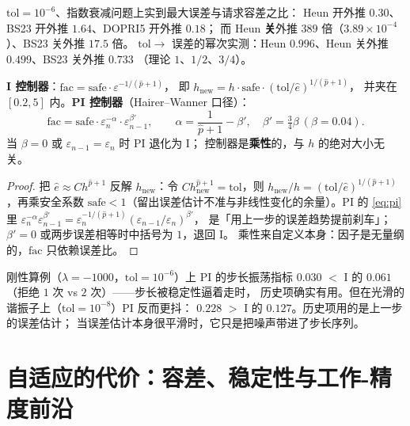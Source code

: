 \begin{corollary}[实测：$389$ 倍的假收敛]
\label{cor:fake}
$\mathrm{tol}=10^{-6}$、指数衰减问题上实到最大误差与请求容差之比：
Heun 开外推 $0.30$、BS23 开外推 $1.64$、DOPRI5 开外推 $0.18$；
而 Heun \textbf{关}外推 $389$ 倍（$3.89\times10^{-4}$）、BS23 关外推 $17.5$ 倍。
$\mathrm{tol}\to$ 误差的幂次实测：Heun $0.996$、Heun 关外推 $0.499$、BS23 关外推 $0.733$
（理论 $1$、$1/2$、$3/4$）。
\end{corollary}

\begin{theorem}[步长控制器]
\label{thm:controller}
\textbf{I 控制器}：$\mathrm{fac}=\mathrm{safe}\cdot\varepsilon^{-1/(\hat p+1)}$，
即 $h_{\text{new}}=h\cdot\mathrm{safe}\cdot(\mathrm{tol}/\hat e)^{1/(\hat p+1)}$，
并夹在 $[0.2,5]$ 内。\textbf{PI 控制器}（Hairer--Wanner 口径）：
\begin{equation}
  \mathrm{fac}=\mathrm{safe}\cdot\varepsilon_n^{-\alpha}\cdot\varepsilon_{n-1}^{\beta'},
  \qquad \alpha=\frac1{\hat p+1}-\beta',\quad \beta'=\tfrac34\beta\ (\beta=0.04).
  \label{eq:pi}
\end{equation}
当 $\beta=0$ 或 $\varepsilon_{n-1}=\varepsilon_n$ 时 PI 退化为 I；
控制器是\textbf{乘性}的，与 $h$ 的绝对大小无关。
\end{theorem}

\begin{proof}
把 $\hat e\approx Ch^{\hat p+1}$ 反解 $h_{\text{new}}$：令
$C h_{\text{new}}^{\hat p+1}=\mathrm{tol}$，则
$h_{\text{new}}/h=(\mathrm{tol}/\hat e)^{1/(\hat p+1)}$，再乘安全系数
$\mathrm{safe}<1$（留出误差估计不准与非线性变化的余量）。PI 的 {\eqref{eq:pi}}
里 $\varepsilon_n^{-\alpha}\varepsilon_{n-1}^{\beta'}
=\varepsilon_n^{-1/(\hat p+1)}(\varepsilon_{n-1}/\varepsilon_n)^{\beta'}$，
是「用上一步的误差趋势提前刹车」；$\beta'=0$ 或两步误差相等时中括号为 $1$，退回 I。
乘性来自定义本身：因子是无量纲的，$\mathrm{fac}$ 只依赖误差比。
\end{proof}

\begin{remark}[实测：PI 不是免费午餐]
刚性算例（$\lambda=-1000$，$\mathrm{tol}=10^{-6}$）上 PI 的步长振荡指标
$0.030$ $<$ I 的 $0.061$（拒绝 $1$ 次 vs $2$ 次）——步长被稳定性逼着走时，
历史项确实有用。但在光滑的谐振子上（$\mathrm{tol}=10^{-8}$）PI 反而更抖：
$0.228$ $>$ I 的 $0.127$。历史项用的是上一步的误差估计；
当误差估计本身很平滑时，它只是把噪声带进了步长序列。
\end{remark}

\section{自适应的代价：容差、稳定性与工作-精度前沿}

